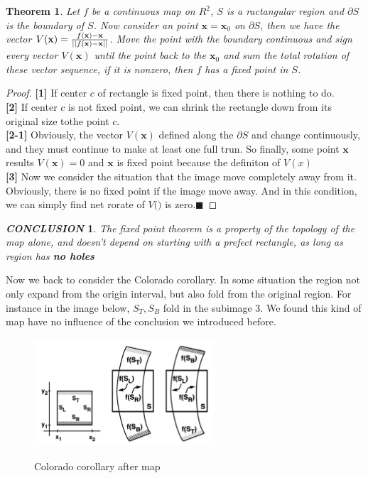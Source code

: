 \documentclass[12pt]{article}
\theoremstyle{plain}
\newtheorem{theorem}{\textbf{Theorem}}[section]
\newtheorem{proof}{\textit{PROOF}}[section]
\newtheorem{conclusion}{\textit{\textbf{CONCLUSION}}}[section]
\begin{document}
\begin{theorem} Let $f$ be a continuous map on $R^2$, $S$ is a ractangular region and $\partial S$ is the boundary of $S$. Now consider an point $\mathbf x = \mathbf x_0$ on $\partial S$, then we have the vector $V(\mathbf x) = {f(\mathbf x) - \mathbf x \over ||f(\mathbf x) - \mathbf x||}$. Move the point with the boundary continuous and sign every vector $V(\mathbf x)$ until the point back to the $\mathbf x_0$ and sum the total rotation of these vector sequence, if it is nonzero, then $f$ has a fixed point in $S$.
\end{theorem}
{\color{blue}
\begin{proof} \textbf{[1]} If center $c$ of rectangle is fixed point, then there is nothing to do.
\\\noindent \textbf{[2]} If center $c$ is not fixed point, we can shrink the rectangle down from its original size tothe point $c$. 
\\\noindent \textbf{[2-1]} Obviously, the vector $V(\mathbf x)$ defined along the $\partial S$ and change continuously, and they must continue to make at least one full trun. So finally, some point $\mathbf x$ results $V(\mathbf x) = 0$ and $\mathbf x$ is fixed point because the definiton of $V(x)$
\\\noindent \textbf{[3]} Now we consider the situation that the image move completely away from it. Obviously, there is no fixed point if the image move away. And in this condition, we can simply find net rorate of $V(\mathbf)$ is zero.$\blacksquare$
\end{proof}
}



\begin{conclusion} The fixed point theorem is a property of the topology of the map alone, and doesn't depend on starting with a prefect rectangle, as long as region has \textbf{no holes}
\end{conclusion}

Now we back to consider the Colorado corollary. In some situation the region not only expand from the origin interval, but also fold from the original region. For instance in the image below, $S_T, S_B$ fold in the subimage 3. We found this kind of map have no influence of the conclusion we introduced before.



\begin{figure}[H]
\begin{center}
\includegraphics[width=0.6\textwidth]{figure/section5/colorado-corollary.png} \\
\end{center}
\caption{Colorado corollary after map}
\end{figure}
\end{document}
